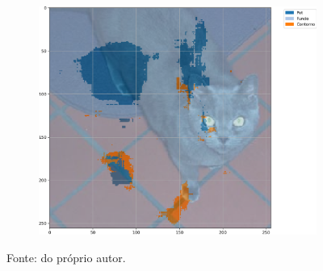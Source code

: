 \begin{figure}[H]
\begin{subfigure}[t]{0.32\textwidth}
         \label{results:fig:semantic:12.2}
     \end{subfigure}%
     ~ 
    \begin{subfigure}[t]{0.32\textwidth}
         \centering
         \includegraphics[width=1\linewidth]{recursos/imagens/results/bpca_acc_unetlike500_image_2_overlayed_segmentation.png}
         \label{results:fig:semantic:12.3}
     \end{subfigure}%

    Fonte: do próprio autor.
\end{figure}

